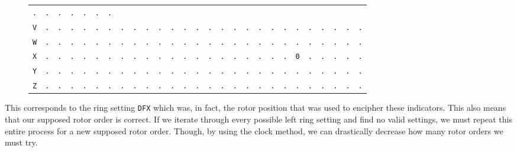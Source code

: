 \begin{figure}[H]
\begin{center}
{\begin{tabular}{c|cccccccccccccccccccccccccc}
        \texttt{.} & \texttt{.} & \texttt{.} & \texttt{.} &
        \texttt{.} & \texttt{.} & \texttt{.}                             \\
        \texttt{V} & \texttt{.} & \texttt{.} & \texttt{.} &
        \texttt{.} & \texttt{.} & \texttt{.} & \texttt{.} &
        \texttt{.} & \texttt{.} & \texttt{.} & \texttt{.} &
        \texttt{.} & \texttt{.} & \texttt{.} & \texttt{.} &
        \texttt{.} & \texttt{.} & \texttt{.} & \texttt{.} &
        \texttt{.} & \texttt{.} & \texttt{.} & \texttt{.} &
        \texttt{.} & \texttt{.} & \texttt{.}                             \\
        \texttt{W} & \texttt{.} & \texttt{.} & \texttt{.} &
        \texttt{.} & \texttt{.} & \texttt{.} & \texttt{.} &
        \texttt{.} & \texttt{.} & \texttt{.} & \texttt{.} &
        \texttt{.} & \texttt{.} & \texttt{.} & \texttt{.} &
        \texttt{.} & \texttt{.} & \texttt{.} & \texttt{.} &
        \texttt{.} & \texttt{.} & \texttt{.} & \texttt{.} &
        \texttt{.} & \texttt{.} & \texttt{.}                             \\
        \texttt{X} & \texttt{.} & \texttt{.} & \texttt{.} &
        \texttt{.} & \texttt{.} & \texttt{.} & \texttt{.} &
        \texttt{.} & \texttt{.} & \texttt{.} & \texttt{.} &
        \texttt{.} & \texttt{.} & \texttt{.} & \texttt{.} &
        \texttt{.} & \texttt{.} & \texttt{.} & \texttt{.} &
        \texttt{.} & \texttt{0} & \texttt{.} & \texttt{.} &
        \texttt{.} & \texttt{.} & \texttt{.}                             \\
        \texttt{Y} & \texttt{.} & \texttt{.} & \texttt{.} &
        \texttt{.} & \texttt{.} & \texttt{.} & \texttt{.} &
        \texttt{.} & \texttt{.} & \texttt{.} & \texttt{.} &
        \texttt{.} & \texttt{.} & \texttt{.} & \texttt{.} &
        \texttt{.} & \texttt{.} & \texttt{.} & \texttt{.} &
        \texttt{.} & \texttt{.} & \texttt{.} & \texttt{.} &
        \texttt{.} & \texttt{.} & \texttt{.}                             \\
        \texttt{Z} & \texttt{.} & \texttt{.} & \texttt{.} &
        \texttt{.} & \texttt{.} & \texttt{.} & \texttt{.} &
        \texttt{.} & \texttt{.} & \texttt{.} & \texttt{.} &
        \texttt{.} & \texttt{.} & \texttt{.} & \texttt{.} &
        \texttt{.} & \texttt{.} & \texttt{.} & \texttt{.} &
        \texttt{.} & \texttt{.} & \texttt{.} & \texttt{.} &
        \texttt{.} & \texttt{.} & \texttt{.}                             \\
      \end{tabular}
    }
  \end{center}
\end{figure}
\noindent This corresponds to the ring setting \texttt{DFX} which
was, in fact, the rotor position that was used to encipher these indicators.
This also means that our supposed rotor order is correct. If we
iterate through every possible left ring setting and find no valid
settings, we must repeat this entire process for a new supposed rotor
order. Though, by using the clock method, we can drastically decrease
how many rotor orders we must try.

